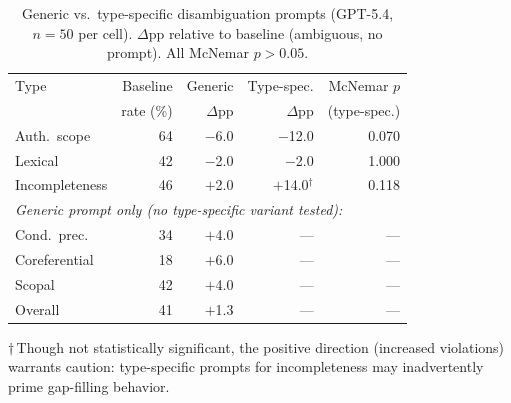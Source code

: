 \begin{table}[!ht]
\centering
\small
\caption{Generic vs.\ type-specific disambiguation prompts (GPT-5.4, $n = 50$ per cell). $\Delta$pp relative to baseline (ambiguous, no prompt). All McNemar $p > 0.05$.}
\label{tab:generic_vs_specific}
\setlength{\tabcolsep}{4pt}
\begin{tabular}{lrrrr}
\toprule
Type & Baseline & Generic & Type-spec. & McNemar $p$ \\
 & rate (\%) & $\Delta$pp & $\Delta$pp & (type-spec.) \\
\midrule
Auth.\ scope & 64 & $-$6.0 & $-$12.0 & 0.070 \\
Lexical & 42 & $-$2.0 & $-$2.0 & 1.000 \\
Incompleteness & 46 & $+$2.0 & $+$14.0$^\dagger$ & 0.118 \\
\midrule
\multicolumn{5}{l}{\textit{Generic prompt only (no type-specific variant tested):}} \\
Cond.\ prec. & 34 & $+$4.0 & --- & --- \\
Coreferential & 18 & $+$6.0 & --- & --- \\
Scopal & 42 & $+$4.0 & --- & --- \\
\midrule
Overall & 41 & $+$1.3 & --- & --- \\
\bottomrule
\end{tabular}

\vspace{2pt}
{\footnotesize $\dagger$\,Though not statistically significant, the positive direction (increased violations) warrants caution: type-specific prompts for incompleteness may inadvertently prime gap-filling behavior.}
\end{table}
